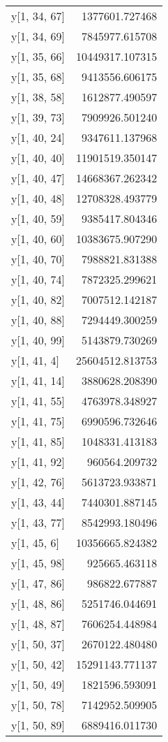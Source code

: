 \begin{longtable}{lr}
y[1, 34, 67] & 1377601.727468 \\
y[1, 34, 69] & 7845977.615708 \\
y[1, 35, 66] & 10449317.107315 \\
y[1, 35, 68] & 9413556.606175 \\
y[1, 38, 58] & 1612877.490597 \\
y[1, 39, 73] & 7909926.501240 \\
y[1, 40, 24] & 9347611.137968 \\
y[1, 40, 40] & 11901519.350147 \\
y[1, 40, 47] & 14668367.262342 \\
y[1, 40, 48] & 12708328.493779 \\
y[1, 40, 59] & 9385417.804346 \\
y[1, 40, 60] & 10383675.907290 \\
y[1, 40, 70] & 7988821.831388 \\
y[1, 40, 74] & 7872325.299621 \\
y[1, 40, 82] & 7007512.142187 \\
y[1, 40, 88] & 7294449.300259 \\
y[1, 40, 99] & 5143879.730269 \\
y[1, 41, 4] & 25604512.813753 \\
y[1, 41, 14] & 3880628.208390 \\
y[1, 41, 55] & 4763978.348927 \\
y[1, 41, 75] & 6990596.732646 \\
y[1, 41, 85] & 1048331.413183 \\
y[1, 41, 92] & 960564.209732 \\
y[1, 42, 76] & 5613723.933871 \\
y[1, 43, 44] & 7440301.887145 \\
y[1, 43, 77] & 8542993.180496 \\
y[1, 45, 6] & 10356665.824382 \\
y[1, 45, 98] & 925665.463118 \\
y[1, 47, 86] & 986822.677887 \\
y[1, 48, 86] & 5251746.044691 \\
y[1, 48, 87] & 7606254.448984 \\
y[1, 50, 37] & 2670122.480480 \\
y[1, 50, 42] & 15291143.771137 \\
y[1, 50, 49] & 1821596.593091 \\
y[1, 50, 78] & 7142952.509905 \\
y[1, 50, 89] & 6889416.011730 \\

\end{longtable}
